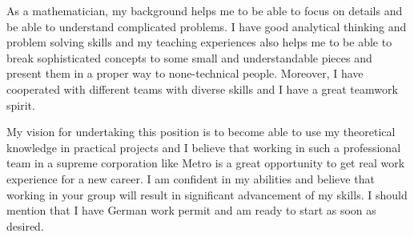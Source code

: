\documentclass[11pt,a4paper,sans]{moderncv}        %
\begin{document}
As a mathematician, my background helps me to be able to focus on details and be able to understand complicated problems. I have good analytical thinking and problem solving skills and my teaching experiences also helps me to be able to break sophisticated concepts to some small and understandable pieces and present them in a proper way to none-technical people. Moreover, I have cooperated with different teams with diverse skills and I have a great teamwork spirit.



My vision for undertaking this position is to become able to use my theoretical knowledge in practical projects and I believe that working in such a professional team in a supreme corporation like Metro is a great opportunity to get real work experience for a new career. I am confident in my abilities and believe that working in your group will result in significant advancement of my skills. I should mention that I have German work permit and am ready to start as soon as desired.

 \vspace{3mm}
 
\makeletterclosing
\end{document}
